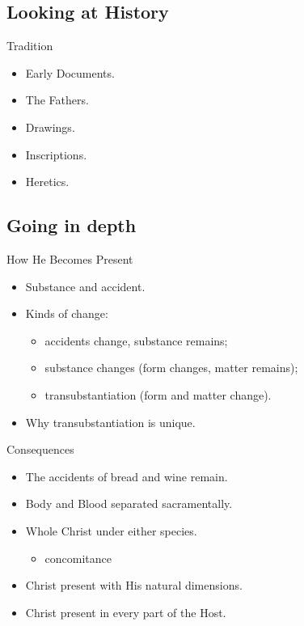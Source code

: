 \documentclass{beamer}
\begin{document}
\subsection{Looking at History}

\begin{frame}{Tradition}
\begin{itemize}
\item Early Documents.
\item The Fathers.
\item Drawings.
\item Inscriptions. 
\item Heretics.
\end{itemize}
\end{frame}

\subsection{Going in depth}

\begin{frame}{How He Becomes Present}
 
\begin{itemize}
\item Substance and accident.
\item Kinds of change: 
\begin{itemize}
\item accidents change, substance remains; 
\item substance changes (form changes, matter remains); 
\item transubstantiation (form and matter change).
\end{itemize}
\item Why transubstantiation is unique.
\end{itemize}
\end{frame}

\begin{frame}{Consequences}
\begin{itemize}
\item The accidents of bread and wine remain.
\item Body and Blood separated sacramentally.
\item Whole Christ under either species.
\begin{itemize}
\item concomitance
\end{itemize}
\item Christ present with His natural dimensions.
\item Christ present in every part of the Host.
\end{itemize}
\end{frame}
\end{document}
